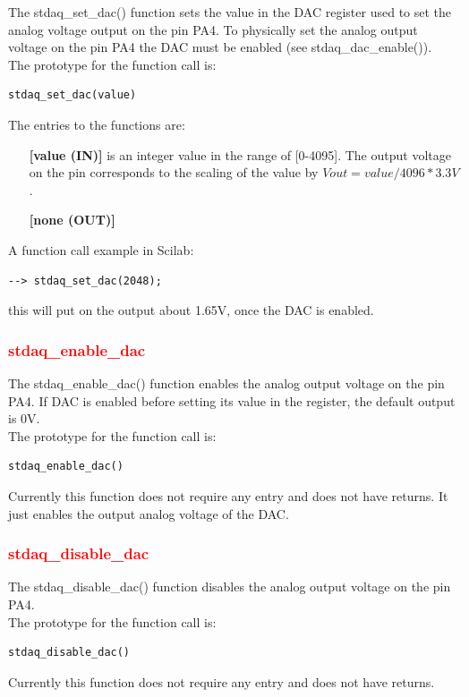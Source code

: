 \documentclass[letterpaper,10pt,english]{hitec}
\begin{document}
The stdaq\_set\_dac() function sets the value in the DAC register used to set the analog voltage output on the pin PA4. To physically set the analog output voltage on the pin PA4 the DAC must be enabled (see stdaq\_dac\_enable()). \\
The prototype for the function call is:
\begin{verbatim}
stdaq_set_dac(value)
\end{verbatim}
The entries to the functions are:
\begin{itemize}
\item [\textbf{[value (IN)]}] is an integer value in the range of [0-4095]. The output voltage on the pin corresponds to the scaling of the value by $Vout = value/4096*3.3V$.
\item [\textbf{[none (OUT)]}] 
\end{itemize}
A function call example in Scilab:
\begin{verbatim}
--> stdaq_set_dac(2048);
\end{verbatim}
this will put on the output about 1.65V, once the DAC is enabled.

\subsubsection{\textcolor{red}{stdaq\_enable\_dac}}

The stdaq\_enable\_dac() function enables the analog output voltage on the pin PA4. If DAC is enabled before setting its value in the register, the default output is 0V. \\
The prototype for the function call is:
\begin{verbatim}
stdaq_enable_dac()
\end{verbatim}
Currently this function does not require any entry and does not have returns. It just enables the output analog voltage of the DAC.

\subsubsection{\textcolor{red}{stdaq\_disable\_dac}}

The stdaq\_disable\_dac() function disables the analog output voltage on the pin PA4. \\
The prototype for the function call is:
\begin{verbatim}
stdaq_disable_dac()
\end{verbatim}
Currently this function does not require any entry and does not have returns.
\end{document}
